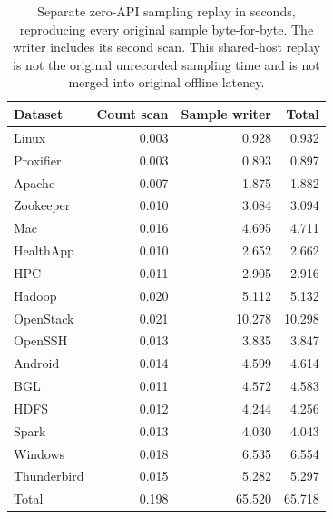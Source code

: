 \begin{longtable}{lrrr}
\caption{Separate zero-API sampling replay in seconds, reproducing every original sample byte-for-byte. The writer includes its second scan. This shared-host replay is not the original unrecorded sampling time and is not merged into original offline latency.}\\
\toprule
Dataset & Count scan & Sample writer & Total \\ \midrule\endhead
Linux & 0.003 & 0.928 & 0.932 \\
Proxifier & 0.003 & 0.893 & 0.897 \\
Apache & 0.007 & 1.875 & 1.882 \\
Zookeeper & 0.010 & 3.084 & 3.094 \\
Mac & 0.016 & 4.695 & 4.711 \\
HealthApp & 0.010 & 2.652 & 2.662 \\
HPC & 0.011 & 2.905 & 2.916 \\
Hadoop & 0.020 & 5.112 & 5.132 \\
OpenStack & 0.021 & 10.278 & 10.298 \\
OpenSSH & 0.013 & 3.835 & 3.847 \\
Android & 0.014 & 4.599 & 4.614 \\
BGL & 0.011 & 4.572 & 4.583 \\
HDFS & 0.012 & 4.244 & 4.256 \\
Spark & 0.013 & 4.030 & 4.043 \\
Windows & 0.018 & 6.535 & 6.554 \\
Thunderbird & 0.015 & 5.282 & 5.297 \\
Total & 0.198 & 65.520 & 65.718 \\
\bottomrule\end{longtable}
